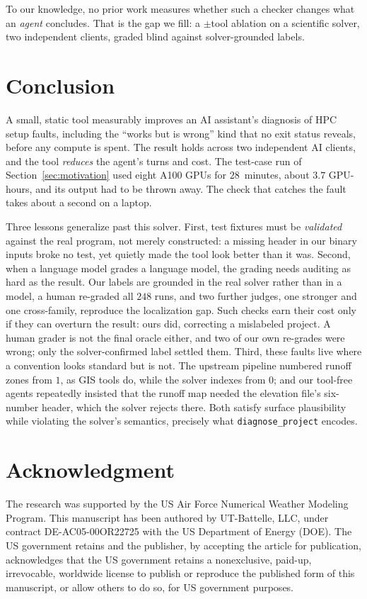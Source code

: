 \documentclass[conference]{IEEEtran}
\begin{document}
To our knowledge, no prior work measures whether such a checker changes what an \emph{agent}
concludes. That is the gap we fill: a $\pm$tool ablation on a scientific solver, two independent
clients, graded blind against solver-grounded labels.

\section{Conclusion}
\label{sec:conclusion}
A small, static tool measurably improves an AI assistant's diagnosis of HPC setup faults,
including the ``works but is wrong'' kind that no exit status reveals, before any compute is
spent. The result
holds across two independent AI clients, and the tool \emph{reduces} the agent's turns and
cost. The test-case run
of Section~\ref{sec:motivation} used eight A100 GPUs for $28$~minutes, about $3.7$ GPU-hours,
and its output had to be thrown away. The check that catches the fault takes about a second on a
laptop.

Three lessons generalize past this solver. First, test fixtures must be \emph{validated} against
the real program, not merely constructed: a missing header in our binary inputs broke no test,
yet quietly made the tool look better than it was. Second, when a language model grades a language model, the grading needs
auditing as hard as the result. Our labels are grounded in the real solver rather than in a model,
a human re-graded all $248$ runs, and two further judges, one stronger and one cross-family,
reproduce the localization gap. Such checks earn their cost only if they
can overturn the result: ours did, correcting a mislabeled project. A human grader
is not the final oracle either, and two of our own re-grades were wrong; only the
solver-confirmed label settled them. Third, these faults live where a convention
looks standard but is not. The upstream pipeline numbered runoff zones from $1$, as GIS tools
do,
while the solver indexes from $0$; and our tool-free agents repeatedly insisted that the runoff
map needed the elevation file's six-number header, which the solver rejects there.
Both satisfy surface plausibility while violating the solver's semantics, precisely what
\texttt{diagnose\_project} encodes.

\section*{Acknowledgment}
The research was supported by the US Air Force Numerical Weather Modeling
Program. This manuscript has been authored by UT-Battelle, LLC, under contract
\mbox{DE-AC05-00OR22725} with the US Department of Energy (DOE). The US government
retains and the publisher, by accepting the article for publication,
acknowledges that the US government retains a nonexclusive, paid-up,
irrevocable, worldwide license to publish or reproduce the published form of
this manuscript, or allow others to do so, for US government purposes.
\end{document}
